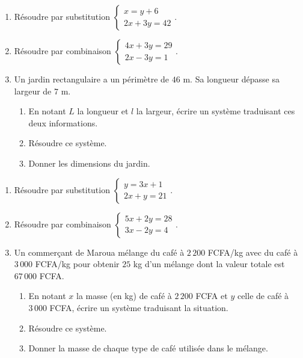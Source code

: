 \begin{enumerate}[label=\arabic*)]
\item Résoudre par substitution $\left\{\begin{array}{l}x=y+6\\2x+3y=42\end{array}\right.$.
\item Résoudre par combinaison $\left\{\begin{array}{l}4x+3y=29\\2x-3y=1\end{array}\right.$.
\item Un jardin rectangulaire a un périmètre de $46$ m. Sa longueur dépasse sa largeur de
$7$ m.
\begin{enumerate}[label=\alph*)]
\item En notant $L$ la longueur et $l$ la largeur, écrire un système traduisant ces deux
informations.
\item Résoudre ce système.
\item Donner les dimensions du jardin.
\end{enumerate}
\end{enumerate}

\begin{enumerate}[label=\arabic*)]
\item Résoudre par substitution $\left\{\begin{array}{l}y=3x+1\\2x+y=21\end{array}\right.$.
\item Résoudre par combinaison $\left\{\begin{array}{l}5x+2y=28\\3x-2y=4\end{array}\right.$.
\item Un commerçant de Maroua mélange du café à $2\,200$ FCFA/kg avec du café à $3\,000$
FCFA/kg pour obtenir $25$ kg d'un mélange dont la valeur totale est $67\,000$ FCFA.
\begin{enumerate}[label=\alph*)]
\item En notant $x$ la masse (en kg) de café à $2\,200$ FCFA et $y$ celle de café à
$3\,000$ FCFA, écrire un système traduisant la situation.
\item Résoudre ce système.
\item Donner la masse de chaque type de café utilisée dans le mélange.
\end{enumerate}
\end{enumerate}

